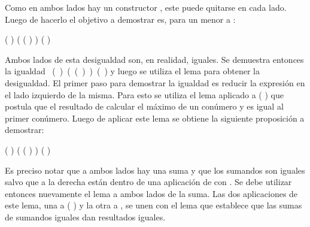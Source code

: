 \begin{AgdaAlign}
Como en ambos lados hay un constructor , este puede quitarse en cada lado. Luego de hacerlo el objetivo a demostrar es, para un  menor a :
\begin{center}
\AgdaFunction{[}  \AgdaFunction{]}  (  \AgdaFunction{+} )  \AgdaFunction{$\leq$} ( ( ) 	) \AgdaFunction{+} (  )
\end{center}

Ambos lados de esta desigualdad son, en realidad, iguales. Se demuestra entonces la igualdad \hbox{\AgdaFunction{[}  \AgdaFunction{]}  (  \AgdaFunction{+} )  \AgdaFunction{$\sim$} ( ( ) ) \AgdaFunction{+} (  )} y luego se utiliza el lema \AgdaFunction{$\sim\rightarrow\leq$} para obtener la desigualdad. El primer paso para demostrar la igualdad es reducir la expresión  en el lado izquierdo de la misma. Para esto se utiliza el lema  aplicado a (  \AgdaFunction{+} ) que postula que el resultado de calcular el máximo de un conúmero y  es igual al primer conúmero. Luego de aplicar este lema se obtiene la siguiente proposición 	a demostrar:
\begin{center}
\AgdaFunction{[}  \AgdaFunction{]} ( ) \AgdaFunction{+}  \AgdaFunction{$\sim$} ( ( ) 	) \AgdaFunction{+} (  )
\end{center}

Es preciso notar que a ambos lados hay una suma y que los sumandos son iguales salvo que a la derecha están dentro de una aplicación de  con . Se debe utilizar entonces nuevamente el lema  a ambos lados de la suma. Las dos aplicaciones de este lema, una a ( ) y la otra a , se unen con el lema  que establece que las sumas de sumandos iguales dan resultados iguales.


\end{AgdaAlign}
